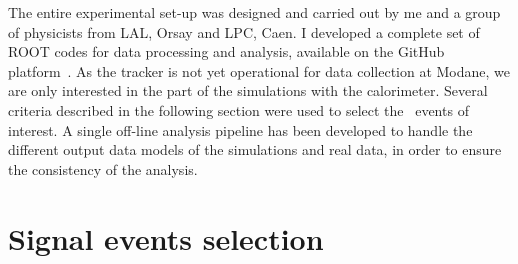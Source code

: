 

The entire experimental set-up was designed and carried out by me and a group of physicists from LAL, Orsay and LPC, Caen.
I developed a complete set of ROOT codes for data processing and analysis, available on the GitHub platform~\cite{myGit}.
As the tracker is not yet operational for data collection at Modane, we are only interested in the part of the simulations with the calorimeter.
Several criteria described in the following section were used to select the \Co\ events of interest.
A single off-line analysis pipeline has been developed to handle the different output data models of the simulations and real data, in order to ensure the consistency of the analysis.

\section{Signal events selection}
\label{subsec:Co_datacut}

